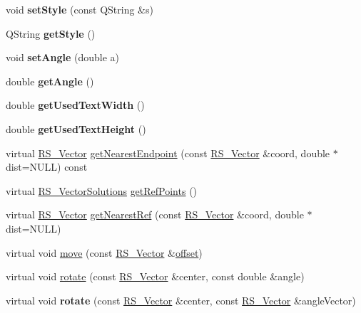 \begin{DoxyCompactItemize}
\item 
\hypertarget{classRS__MText_a9e22c913d19f61b35f2b5dc0c8d80fe6}{void {\bfseries set\-Style} (const Q\-String \&s)}\label{classRS__MText_a9e22c913d19f61b35f2b5dc0c8d80fe6}

\item 
\hypertarget{classRS__MText_a1764cdf9b35caaa3c90664a1000d24dd}{Q\-String {\bfseries get\-Style} ()}\label{classRS__MText_a1764cdf9b35caaa3c90664a1000d24dd}

\item 
\hypertarget{classRS__MText_af5ecb3749bc68a34ac4b13eaeabbb220}{void {\bfseries set\-Angle} (double a)}\label{classRS__MText_af5ecb3749bc68a34ac4b13eaeabbb220}

\item 
\hypertarget{classRS__MText_ac29e80c8346e7d4c29a5bd32eb0d9671}{double {\bfseries get\-Angle} ()}\label{classRS__MText_ac29e80c8346e7d4c29a5bd32eb0d9671}

\item 
\hypertarget{classRS__MText_a0d0aba4f2fde4ad4e9a59a8750a4be5d}{double {\bfseries get\-Used\-Text\-Width} ()}\label{classRS__MText_a0d0aba4f2fde4ad4e9a59a8750a4be5d}

\item 
\hypertarget{classRS__MText_a29ec6b8e5dfc4be0885c53627790a840}{double {\bfseries get\-Used\-Text\-Height} ()}\label{classRS__MText_a29ec6b8e5dfc4be0885c53627790a840}

\item 
virtual \hyperlink{classRS__Vector}{R\-S\-\_\-\-Vector} \hyperlink{classRS__MText_a5d6767b7ccfd2a5e18763d5f346bfee5}{get\-Nearest\-Endpoint} (const \hyperlink{classRS__Vector}{R\-S\-\_\-\-Vector} \&coord, double $\ast$dist=N\-U\-L\-L) const 
\item 
virtual \hyperlink{classRS__VectorSolutions}{R\-S\-\_\-\-Vector\-Solutions} \hyperlink{classRS__MText_a92b6ebaea28fa8154f37aee6d1f4dce0}{get\-Ref\-Points} ()
\item 
virtual \hyperlink{classRS__Vector}{R\-S\-\_\-\-Vector} \hyperlink{classRS__MText_a783711ea847b41f9259100330e273280}{get\-Nearest\-Ref} (const \hyperlink{classRS__Vector}{R\-S\-\_\-\-Vector} \&coord, double $\ast$dist=N\-U\-L\-L)
\item 
virtual void \hyperlink{classRS__MText_a1bce3cbb107f7186ec73a34fe7cf3b63}{move} (const \hyperlink{classRS__Vector}{R\-S\-\_\-\-Vector} \&\hyperlink{classRS__Entity_aa296d21b9aac99161d386ce2f60f0fea}{offset})
\item 
virtual void \hyperlink{classRS__MText_a1b13823ed89f882e346ca929ddf985ee}{rotate} (const \hyperlink{classRS__Vector}{R\-S\-\_\-\-Vector} \&center, const double \&angle)
\item 
\hypertarget{classRS__MText_a5fdb4fcc7eea213b5a0f2652ddcfb811}{virtual void {\bfseries rotate} (const \hyperlink{classRS__Vector}{R\-S\-\_\-\-Vector} \&center, const \hyperlink{classRS__Vector}{R\-S\-\_\-\-Vector} \&angle\-Vector)}\label{classRS__MText_a5fdb4fcc7eea213b5a0f2652ddcfb811}


\end{DoxyCompactItemize}
